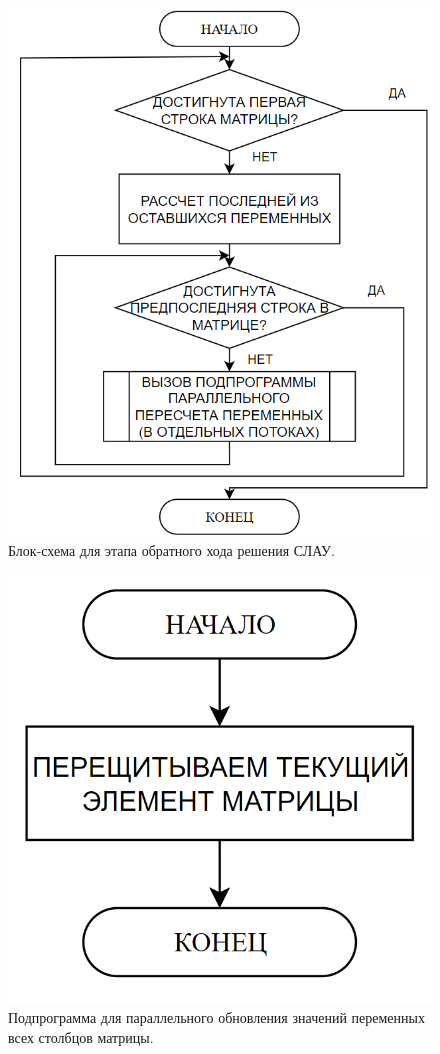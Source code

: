 \documentclass{altsu-bachelor}
\begin{document}
\begin{figure}[H]
    \centering
    \includegraphics[scale=0.7]{reverse.png}
    \caption{Блок-схема для этапа обратного хода решения СЛАУ.}
    \label{fig:reverse}
\end{figure}

\begin{figure}[H]
    \centering
    \includegraphics[scale=0.4]{reverse_ladder.png}
    \caption{Подпрограмма для параллельного обновления значений переменных всех столбцов матрицы.}
    \label{fig:rev_ladder}
\end{figure}
\end{document}
